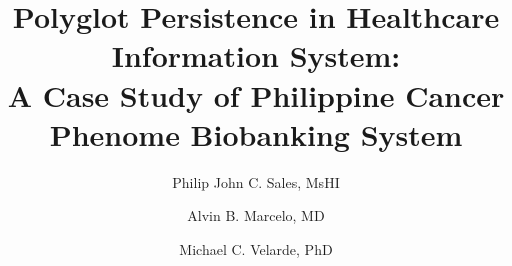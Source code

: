 \documentclass[5p,times,authoryear]{elsarticle}
\begin{document}
\begin{frontmatter}






\title{Polyglot Persistence in Healthcare Information System:\\
A Case Study of Philippine Cancer Phenome Biobanking System}



\author[First]{Philip John C. Sales, MsHI}

\author[Second]{Alvin B. Marcelo, MD}

\author[Third]{Michael C. Velarde, PhD }



\address[First]{University of the Philippines - Manila, College of Medicine, Medical Informatics Unit (MIU). }
\address[Second]{University of the Philippines - Diliman, Institute of Biology, Regen Laboratory.}
\address[Third]{University of the Philippines - Manila, Philippine General Hospital, General Surgery Department.}


\end{frontmatter}
\end{document}
